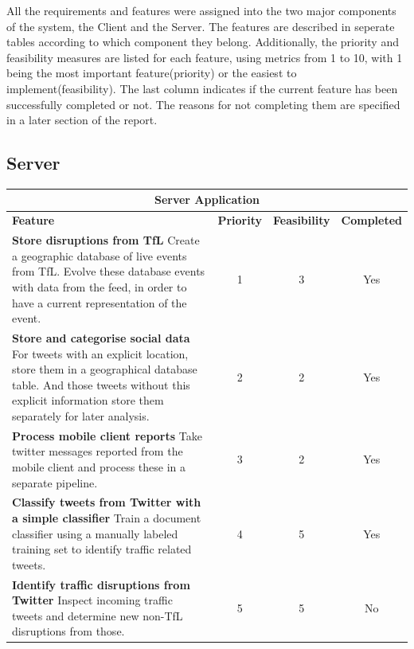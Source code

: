 All the requirements and features were assigned into the two major components of the system, 
the Client and the Server. The features are described in seperate tables according to which component they belong. 
Additionally, the priority and feasibility measures are listed for each feature, using metrics from 
1 to 10, with 1 being the most important feature(priority) or the easiest to implement(feasibility). 
The last column indicates if the current feature has been successfully completed or not. The reasons for 
not completing them are specified in a later section of the report.

\subsection{Server}

\begin{center}
\begin{tabular}{ | p{8.5cm} | c | c | c | }
\hline
\multicolumn{4}{|c|}{\textbf{Server Application}} \\ \hline
\textbf{Feature} & \textbf{Priority} & \textbf{Feasibility} & \textbf{Completed}
\\ \hline
\textbf{Store disruptions from TfL} \newline
Create a geographic database of live events from TfL. Evolve these database events with data from the feed, in order to have a current representation of the event. & 1 & 3 & Yes \\ \hline

\textbf{Store and categorise social data} \newline
For tweets with an explicit location, store them in a geographical database
table. And those tweets without this explicit information store them separately for later
analysis. & 2 & 2 & Yes \\ \hline

\textbf{Process mobile client reports} \newline
Take twitter messages reported from the mobile client and process these in a
separate pipeline. & 3 & 2 & Yes \\ \hline

\textbf{Classify tweets from Twitter with a simple classifier} \newline
Train a document classifier using a manually labeled training set to 
identify traffic related tweets. & 4 & 5 & Yes \\ \hline \hline

\textbf{Identify traffic disruptions from Twitter} \newline
Inspect incoming traffic tweets and determine new non-TfL disruptions from
those. & 5 & 5 & No \\ \hline


\end{tabular}
\end{center}
